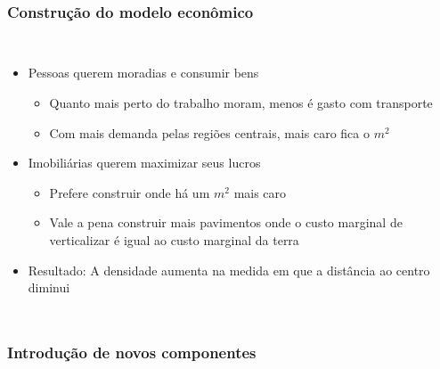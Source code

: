 \documentclass[%
    9pt, 
    aspectratio=169,
]{beamer}
\begin{document}
\begin{frame}
    \frametitle{Construção do modelo econômico}
    \framesubtitle{\cite{papageorgiou2012essay, fujita1989urban,brueckner2011lectures}}

    \begin{columns}
        \begin{itemize}
            \item Pessoas querem moradias e consumir bens
            \begin{itemize}
                \item Quanto mais perto do trabalho moram, menos é gasto com transporte
                \item Com mais demanda pelas regiões centrais, mais caro fica o $m^2$
            \end{itemize}
            \item Imobiliárias querem maximizar seus lucros
            \begin{itemize}
                \item Prefere construir onde há um $m^2$ mais caro
                \item Vale a pena construir mais pavimentos onde o custo marginal de verticalizar é igual ao custo marginal da terra
            \end{itemize}
            \item Resultado: A densidade aumenta na medida em que a distância ao centro diminui
        \end{itemize}

        
    \end{columns}
\end{frame}

\begin{frame}
    \frametitle{Introdução de novos componentes}
    \framesubtitle{\cite{papageorgiou2012essay, fujita1989urban,brueckner2011lectures}}

    \begin{columns}
        

        
    \end{columns}
\end{frame}

\end{document}
